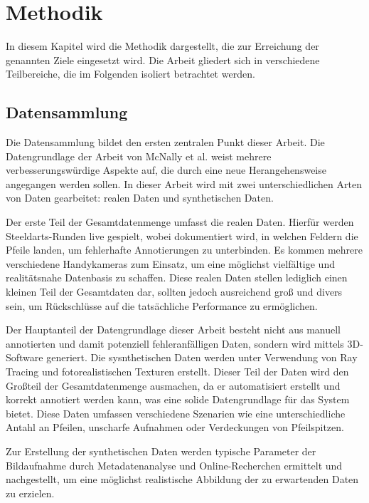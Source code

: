 \section{Methodik}
\label{sec:methodik}

In diesem Kapitel wird die Methodik dargestellt, die zur Erreichung der genannten Ziele eingesetzt wird. Die Arbeit gliedert sich in verschiedene Teilbereiche, die im Folgenden isoliert betrachtet werden.

\subsection{Datensammlung}
\label{sec:methodik:datensammlung}

Die Datensammlung bildet den ersten zentralen Punkt dieser Arbeit. Die Datengrundlage der Arbeit von McNally et al. weist mehrere verbesserungswürdige Aspekte auf, die durch eine neue Herangehensweise angegangen werden sollen. In dieser Arbeit wird mit zwei unterschiedlichen Arten von Daten gearbeitet: realen Daten und synthetischen Daten.

Der erste Teil der Gesamtdatenmenge umfasst die realen Daten. Hierfür werden Steeldarts-Runden live gespielt, wobei dokumentiert wird, in welchen Feldern die Pfeile landen, um fehlerhafte Annotierungen zu unterbinden. Es kommen mehrere verschiedene Handykameras zum Einsatz, um eine möglichst vielfältige und realitätsnahe Datenbasis zu schaffen. Diese realen Daten stellen lediglich einen kleinen Teil der Gesamtdaten dar, sollten jedoch ausreichend groß und divers sein, um Rückschlüsse auf die tatsächliche Performance zu ermöglichen.

Der Hauptanteil der Datengrundlage dieser Arbeit besteht nicht aus manuell annotierten und damit potenziell fehleranfälligen Daten, sondern wird mittels 3D-Software generiert. Die sysnthetischen Daten werden unter Verwendung von Ray Tracing und fotorealistischen Texturen erstellt. Dieser Teil der Daten wird den Großteil der Gesamtdatenmenge ausmachen, da er automatisiert erstellt und korrekt annotiert werden kann, was eine solide Datengrundlage für das System bietet. Diese Daten umfassen verschiedene Szenarien wie eine unterschiedliche Antahl an Pfeilen, unscharfe Aufnahmen oder Verdeckungen von Pfeilspitzen.

Zur Erstellung der synthetischen Daten werden typische Parameter der Bildaufnahme durch Metadatenanalyse und Online-Recherchen ermittelt und nachgestellt, um eine möglichst realistische Abbildung der zu erwartenden Daten zu erzielen.

